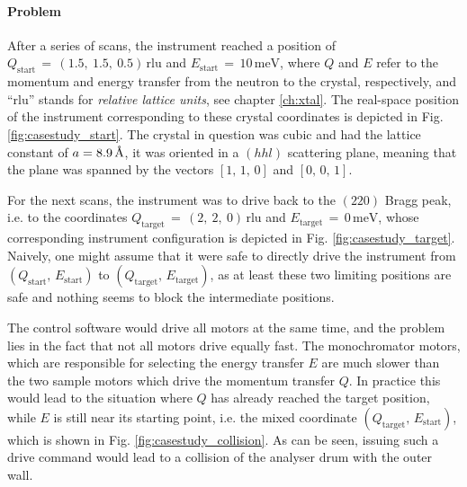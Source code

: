 \paragraph{Problem}
After a series of scans, the instrument reached a position of 
$Q_\mathrm{start}\,=\,\left(1.5,\ 1.5,\ 0.5\right)\, \mathrm{rlu}$ and  $E_\mathrm{start}\,=\,10\, \mathrm{meV}$, where
$Q$ and $E$ refer to the momentum and energy transfer from the neutron to the crystal, respectively,
and ``rlu'' stands for \textit{relative lattice units}, see chapter \ref{ch:xtal}. 
The real-space position of the instrument corresponding to these crystal coordinates is depicted in Fig. \ref{fig:casestudy_start}.
The crystal in question was cubic and had the lattice constant of $a = 8.9\,\textup{\AA}$, it was
oriented in a $(hhl)$ scattering plane, meaning that the plane was spanned by the vectors
$\left[1,\, 1,\, 0\right]$ and $\left[0,\, 0,\, 1\right]$.

For the next scans, the instrument was to drive back to the $\left(220\right)$ Bragg peak, 
i.e. to the coordinates $Q_\mathrm{target}\,=\,\left(2,\ 2,\ 0\right)\, \mathrm{rlu}$ and  $E_\mathrm{target}\,=\,0\, \mathrm{meV}$,
whose corresponding instrument configuration is depicted in Fig. \ref{fig:casestudy_target}.
Naively, one might assume that it were safe to directly drive the instrument from $\left(Q_\mathrm{start},\, E_\mathrm{start}\right)$
to $\left(Q_\mathrm{target},\, E_\mathrm{target}\right)$, as at least these two limiting positions are safe and nothing seems to block
the intermediate positions.

The control software would drive all motors at the same time, and the problem lies in the fact that not all motors
drive equally fast. The monochromator motors, which are responsible for selecting the energy transfer $E$ are
much slower than the two sample motors which drive the momentum transfer $Q$. In practice this would lead to
the situation where $Q$ has already reached the target position, while $E$ is still near its starting point, i.e. the 
mixed coordinate $\left(Q_\mathrm{target},\, E_\mathrm{start}\right)$, which is shown in Fig. \ref{fig:casestudy_collision}.
As can be seen, issuing such a drive command would lead to a collision of the analyser drum with the outer wall.

